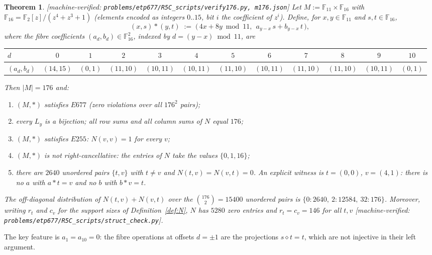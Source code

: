 \documentclass[11pt]{article}
\theoremstyle{plain}
\newtheorem{theorem}{Theorem}[section]
\theoremstyle{definition}
\theoremstyle{remark}
\numberwithin{equation}{section}
\newcommand{\F}{\mathbb{F}}
\newcommand{\op}{\mathbin{*}}
\newcommand{\statusbox}[1]{{\small\sloppy\textsf{[#1]}}}
\newcommand{\MV}[1]{\statusbox{machine-verified: \texttt{#1}}}
\begin{document}
\begin{theorem}\label{thm:176}
\MV{problems\slash etp677\slash R5C\_scripts\slash verify176.py, m176.json}
Let $M := \F_{11}\times\F_{16}$ with $\F_{16} = \F_2[z]/(z^4+z^3+1)$ (elements encoded as
integers $0..15$, bit $i$ the coefficient of $z^i$). Define, for $x,y\in\F_{11}$ and
$s,t\in\F_{16}$,
\[
  (x,s) \op (y,t) \;:=\; \bigl(\,4x+8y \bmod 11,\ \ a_{y-x}\,s + b_{y-x}\,t\,\bigr),
\]
where the fibre coefficients $(a_d,b_d)\in\F_{16}^2$, indexed by $d = (y-x)\bmod 11$, are
\begin{center}
{\footnotesize
\setlength{\tabcolsep}{3.5pt}
\begin{tabular}{lccccccccccc}
\toprule
$d$ & $0$ & $1$ & $2$ & $3$ & $4$ & $5$ & $6$ & $7$ & $8$ & $9$ & $10$\\
\midrule
$(a_d,b_d)$ & $(14,15)$ & $(0,1)$ & $(11,10)$ & $(10,11)$ & $(10,11)$ & $(11,10)$
            & $(10,11)$ & $(11,10)$ & $(11,10)$ & $(10,11)$ & $(0,1)$\\
\bottomrule
\end{tabular}}
\end{center}
Then $|M| = 176$ and:
\begin{enumerate}
\item[(a)] $(M,\op)$ satisfies $E677$ (zero violations over all $176^2$ pairs);
\item[(b)] every $L_y$ is a bijection; all row sums and all column sums of $N$ equal $176$;
\item[(c)] $(M,\op)$ satisfies $E255$: $N(v,v) = 1$ for every $v$;
\item[(d)] $(M,\op)$ is \emph{not} right-cancellative: the entries of $N$ take the values
$\{0,1,16\}$;
\item[(e)] there are $2640$ unordered pairs $\{t,v\}$ with $t\ne v$ and
$N(t,v) = N(v,t) = 0$. An explicit witness is $t = (0,0)$, $v = (4,1)$: there is no $a$ with
$a\op t = v$ and no $b$ with $b\op v = t$.
\end{enumerate}
The off-diagonal distribution of $N(t,v)+N(v,t)$ over the $\binom{176}{2} = 15400$ unordered
pairs is $\{0 : 2640,\ 2: 12584,\ 32: 176\}$. Moreover, writing
$r_t$ and $c_v$ for the support sizes of Definition~\ref{def:N},
$N$ has $5280$ zero entries and
$r_t = c_v = 146$ for all $t,v$
\MV{problems\slash etp677\slash R5C\_scripts\slash struct\_check.py}.
\end{theorem}

The key feature is $a_1 = a_{10} = 0$: the fibre operations at offsets $d = \pm 1$ are the
projections $s\diamond t = t$, which are not injective in their left argument.
\end{document}
